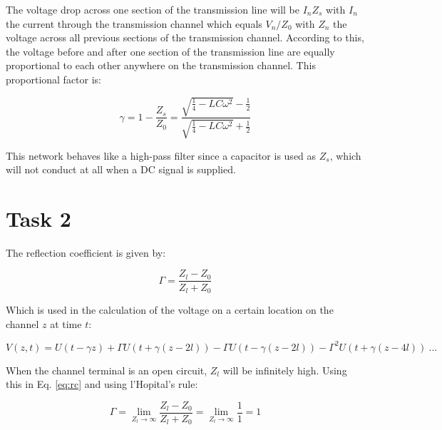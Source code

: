 \documentclass[final]{scrreprt} %
\begin{document}
The voltage drop across one section of the transmission line will be $I_n Z_s$ with $I_n$ the current through the transmission channel which equals $V_n / Z_0$ with $Z_n$ the voltage across all previous sections of the transmission channel. According to this, the voltage before and after one section of the transmission line are equally proportional to each other anywhere on the transmission channel. This proportional factor is:


\begin{equation}
	\gamma = 1 - \frac{Z_s}{Z_0} = \frac{\sqrt{\frac{1}{4} - LC \omega^2} - \frac{1}{2}}{\sqrt{\frac{1}{4} - LC \omega^2} + \frac{1}{2}}
\end{equation}

This network behaves like a high-pass filter since a capacitor is used as $Z_s$, which will not conduct at all when a DC signal is supplied.

\section{Task 2}
The reflection coefficient is given by:

\begin{equation}
	\Gamma = \frac{Z_l - Z_0}{Z_l + Z_0}
\label{eq:rc}
\end{equation}

Which is used in the calculation of the voltage on a certain location on the channel $z$ at time $t$:

\begin{equation}
	V(z,t) = U(t - \gamma z) + \Gamma U(t + \gamma(z - 2l)) - \Gamma U(t - \gamma(z - 2l)) - \Gamma^2 U(t + \gamma(z - 4l)) ~ ...
\label{eq:v}
\end{equation}

When the channel terminal is an open circuit, $Z_l$ will be infinitely high. Using this in Eq. \ref{eq:rc} and using l'Hopital's rule:

\begin{equation}
	\Gamma = \lim_{Z_l \to \infty} \frac{Z_l - Z_0}{Z_l + Z_0} = \lim_{Z_l \to \infty} \frac{1}{1} = 1
\end{equation}
\end{document}
